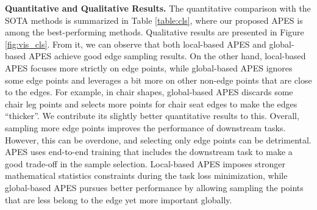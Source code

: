 \documentclass[10pt,twocolumn,letterpaper]{article}
\begin{document}
\textbf{Quantitative and Qualitative Results.}
The quantitative comparison with the SOTA methods is summarized in Table \ref{table:cls}, where our proposed APES is among the best-performing methods. Qualitative results are presented in Figure \ref{fig:vis_cls}. From it, we can observe that both local-based APES and global-based APES achieve good edge sampling results. On the other hand, local-based APES focuses more strictly on edge points, while global-based APES ignores some edge points and leverages a bit more on other non-edge points that are close to the edges. 
For example, in chair shapes, global-based APES discards some chair leg points and selects more points for chair seat edges to make the edges “thicker”. We contribute its slightly better quantitative results to this.
Overall, sampling more edge points improves the performance of downstream tasks. However, this can be overdone, and selecting only edge points can be detrimental. APES uses end-to-end training that includes the downstream task to make a good trade-off in the sample selection.
Local-based APES imposes stronger mathematical statistics constraints during the task loss minimization, while global-based APES pursues better performance by allowing sampling the points that are less belong to the edge yet more important globally.
\end{document}

